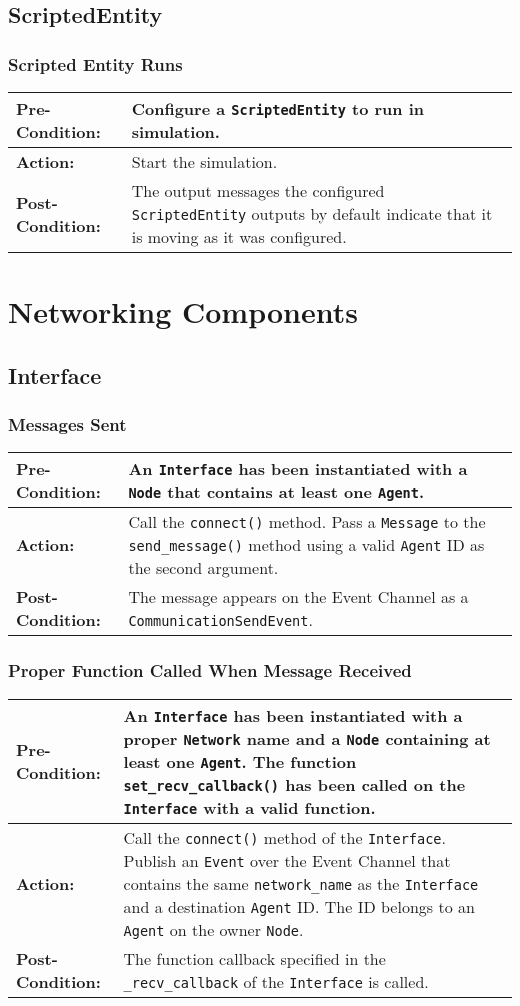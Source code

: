 \documentclass[titlepage]{article}
\newcommand{\testcase}[3]{
    \begin{center}
    \begin{tabular}{| l | p{0.7\textwidth}|}
        \hline
        \rowcolor[gray]{0.8}\textbf{Pre-Condition:} & #1 \\ \hline
        \textbf{Action:} & #2 \\ \hline
        \rowcolor[gray]{0.8}\textbf{Post-Condition:} & #3 \\ \hline
    \end{tabular}
    \end{center}
}
\begin{document}

\subsection{ScriptedEntity}
\subsubsection{Scripted Entity Runs}
\testcase{Configure a \texttt{ScriptedEntity} to run in simulation.}{Start the simulation.}{The output messages the configured \texttt{ScriptedEntity} outputs by default indicate that it is moving as it was configured.}

\section{Networking Components}
\subsection{Interface}
\subsubsection{Messages Sent}
\testcase{An \texttt{Interface} has been instantiated with a \texttt{Node} that contains at least one \texttt{Agent}.}{Call the \texttt{connect()} method. Pass a \texttt{Message} to the \texttt{send\_message()} method using a valid \texttt{Agent} ID as the second argument.}{The message appears on the Event Channel as a \texttt{CommunicationSendEvent}.}

\subsubsection{Proper Function Called When Message Received}
\testcase{An \texttt{Interface} has been instantiated with a proper \texttt{Network} name and a \texttt{Node} containing at least one \texttt{Agent}. The function \texttt{set\_recv\_callback()} has been called on the \texttt{Interface} with a valid function.}{Call the \texttt{connect()} method of the \texttt{Interface}. Publish an \texttt{Event} over the Event Channel that contains the same \texttt{network\_name} as the \texttt{Interface} and a destination \texttt{Agent} ID. The ID belongs to an \texttt{Agent} on the owner \texttt{Node}.}{The function callback specified in the \texttt{\_recv\_callback} of the \texttt{Interface} is called.}
\end{document}
